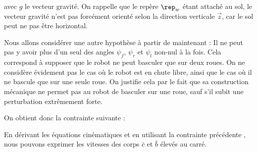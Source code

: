 					avec $g$ le vecteur gravité. On rappelle que le repère $\rep_w$ étant attaché au sol, le vecteur gravité n'est pas forcément orienté selon la direction verticale $\vec{z}$, car le sol peut ne pas être horizontal.
					
					
					Nous allons considérer une autre hypothèse à partir de maintenant : Il ne peut pas y avoir plus d'un seul des angles $\psi_f$, $\psi_r$ et $\psi_l$ non-nul à la fois. 
					Cela correspond à supposer que le robot ne peut basculer que sur deux roues. On ne considère évidement pas le cas où le robot est en chute libre, ainsi que le cas où il ne bascule que sur une seule roue.
					On justifie cela par le fait que sa construction mécanique ne permet pas au robot de basculer sur une roue, sauf s'il subit une perturbation extrêmement forte.
					
					
					On obtient donc la contrainte suivante :
					
				
					En dérivant les équations cinématiques  et en utilisant la contrainte précédente , nous pouvons exprimer les vitesses des corps $\bar{c}$ et $\bar{b}$ élevés au carré.
			
